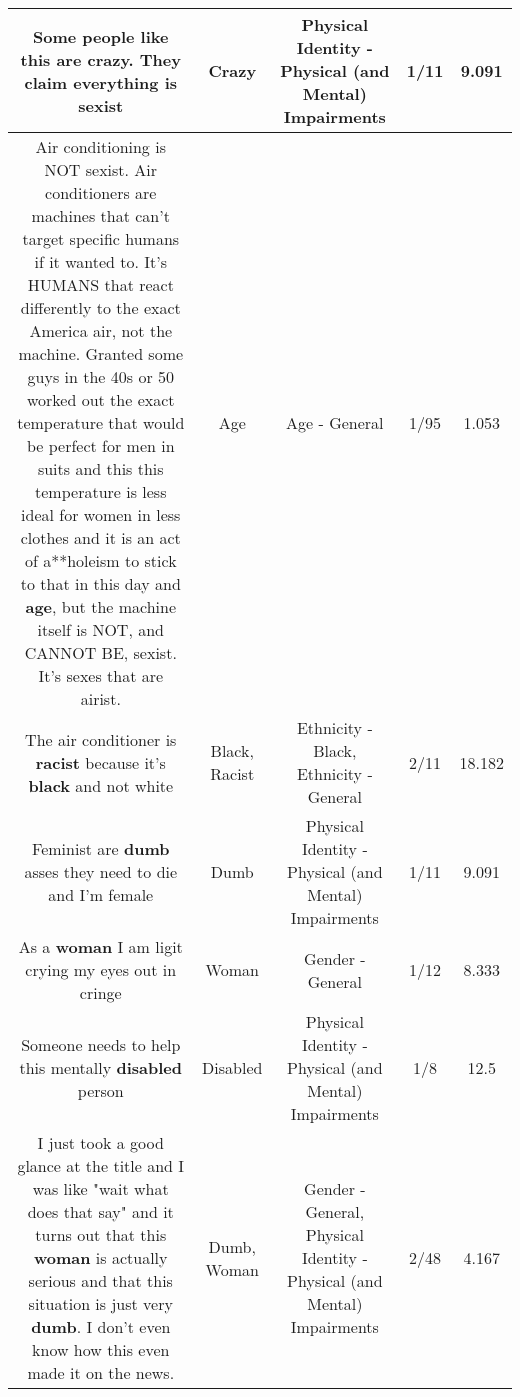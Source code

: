 \documentclass[11pt]{article}
\newlength\mylength
\begin{document}
\begin{center}
\begin{longtable}{|C{.65\mylength}|C{.30\mylength}|C{.12\mylength}|C{.12\mylength}|C{.12\mylength}|}
  \small Some people like this are \textbf{crazy}. They claim everything is sexist\normalsize   & Crazy & Physical Identity - Physical (and Mental) Impairments & 1/11 & 9.091 \\  \hline
  \small Air conditioning is NOT sexist. Air conditioners are machines that can't target specific humans if it wanted to. It's HUMANS that react differently to the exact America air, not the machine. Granted some guys in the 40s or 50 worked out the exact temperature that would be perfect for men in suits and this this temperature is less ideal for women in less clothes and it is an act of a**holeism to stick to that in this day and \textbf{age}, but the machine itself is NOT, and CANNOT BE, sexist. It's sexes that are airist.\normalsize   & Age & Age - General & 1/95 & 1.053 \\  \hline
  \small The air conditioner is \textbf{racist} because it's \textbf{black} and not white\normalsize   & Black, Racist & Ethnicity - Black, Ethnicity - General & 2/11 & 18.182 \\  \hline
  \small Feminist are \textbf{dumb} asses they need to die and I'm female\normalsize   & Dumb & Physical Identity - Physical (and Mental) Impairments & 1/11 & 9.091 \\  \hline
  \small As a \textbf{woman} I am ligit crying my eyes out in cringe\normalsize   & Woman & Gender - General & 1/12 & 8.333 \\  \hline
  \small Someone needs to help this mentally \textbf{disabled} person\normalsize   & Disabled & Physical Identity - Physical (and Mental) Impairments & 1/8 & 12.5 \\  \hline
  \small I just took a good glance at the title and I was like "wait what does that say" and it turns out that this \textbf{woman} is actually serious and that this situation is just very \textbf{dumb}. I don't even know how this even made it on the news.\normalsize   & Dumb, Woman & Gender - General, Physical Identity - Physical (and Mental) Impairments & 2/48 & 4.167 \\  \hline

\end{longtable}
\end{center}
\end{document}
